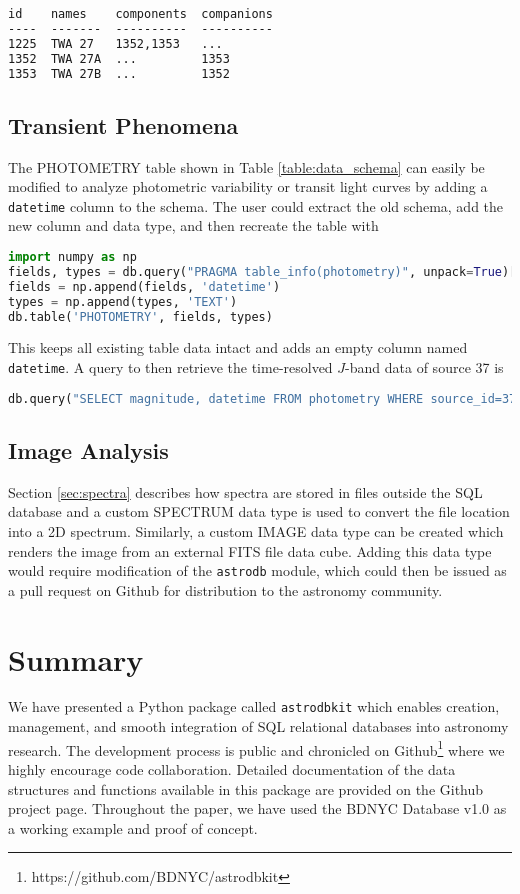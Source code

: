 \documentclass[iop,revtex4,natbib209]{emulateapj}
\begin{document}
\begin{lstlisting}[language=TeX]
id    names    components  companions
----  -------  ----------  ----------
1225  TWA 27   1352,1353   ...
1352  TWA 27A  ...         1353
1353  TWA 27B  ...         1352
\end{lstlisting}

\subsection{Transient Phenomena}
The PHOTOMETRY table shown in Table \ref{table:data_schema} can easily be modified to analyze photometric variability or transit light curves by adding a \texttt{datetime} column to the schema. The user could extract the old schema, add the new column and data type, and then recreate the table with

\begin{lstlisting}[language=Python]
import numpy as np
fields, types = db.query("PRAGMA table_info(photometry)", unpack=True)[1:3]
fields = np.append(fields, 'datetime')
types = np.append(types, 'TEXT')
db.table('PHOTOMETRY', fields, types)
\end{lstlisting}

This keeps all existing table data intact and adds an empty column named \texttt{datetime}. A query to then retrieve the time-resolved $J$-band data of source 37 is

\begin{lstlisting}[language=Python]
db.query("SELECT magnitude, datetime FROM photometry WHERE source_id=37 AND band='J'")
\end{lstlisting}

\subsection{Image Analysis}
Section \ref{sec:spectra} describes how spectra are stored in files outside the SQL database and a custom SPECTRUM data type is used to convert the file location into a 2D spectrum. Similarly, a custom IMAGE data type can be created which renders the image from an external FITS file data cube. Adding this data type would require modification of the \texttt{astrodb} module, which could then be issued as a pull request on Github for distribution to the astronomy community.

\section{Summary}{\label{sec:summary}}
We have presented a Python package called \texttt{astrodbkit} which enables creation, management, and smooth integration of SQL relational databases into astronomy research. The development process is public and chronicled on Github\footnote{https://github.com/BDNYC/astrodbkit} where we highly encourage code collaboration. Detailed documentation of the data structures and functions available in this package are provided on the Github project page. Throughout the paper, we have used the BDNYC Database v1.0 as a working example and proof of concept.
\end{document}
